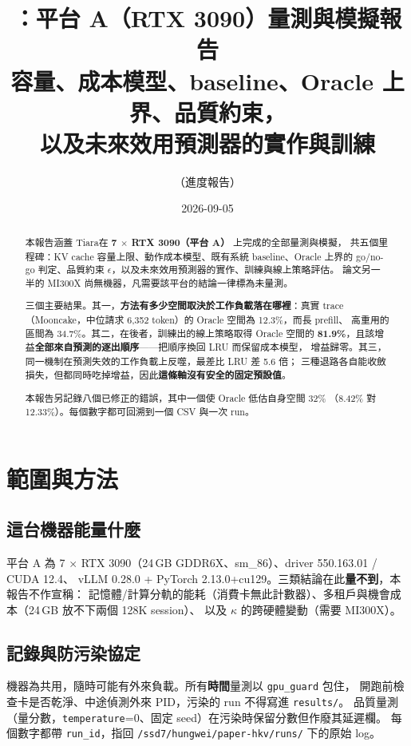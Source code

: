 \documentclass[11pt]{article}
\title{\textbf{\sys：平台 A（RTX 3090）量測與模擬報告}\\[0.35em]
\large 容量、成本模型、baseline、Oracle 上界、品質約束，\\
以及未來效用預測器的實作與訓練}
\author{（進度報告）}
\date{2026-09-05}
\newcommand{\sys}{\mbox{Tiara}}
\newcommand{\key}[1]{\textcolor{hlcol}{\textbf{#1}}}
\begin{document}
\maketitle

\begin{abstract}
\noindent
本報告涵蓋 \sys 在 \textbf{7 $\times$ RTX 3090（平台 A）} 上完成的全部量測與模擬，
共五個里程碑：KV cache 容量上限、動作成本模型、既有系統 baseline、Oracle 上界的
go/no-go 判定、品質約束 $\epsilon$，以及未來效用預測器的實作、訓練與線上策略評估。
論文另一半的 MI300X 尚無機器，凡需要該平台的結論一律標為未量測。

三個主要結果。其一，\key{方法有多少空間取決於工作負載落在哪裡}：真實 trace
（Mooncake，中位請求 6{,}352 token）的 Oracle 空間為 12.3\%，而長 prefill、
高重用的區間為 34.7\%。其二，在後者，訓練出的線上策略取得 Oracle 空間的
\key{81.9\%}，且該增益\key{全部來自預測的逐出順序}——把順序換回 LRU 而保留成本模型，
增益歸零。其三，同一機制在預測失效的工作負載上反噬，最差比 LRU 差 5.6 倍；
三種退路各自能收斂損失，但都同時吃掉增益，因此\key{這條軸沒有安全的固定預設值}。

本報告另記錄八個已修正的錯誤，其中一個使 Oracle 低估自身空間 32\%
（8.42\% 對 12.33\%）。每個數字都可回溯到一個 CSV 與一次 run。
\end{abstract}

\tableofcontents
\vspace{1em}

\section{範圍與方法}

\subsection{這台機器能量什麼}
平台 A 為 7 $\times$ RTX 3090（24\,GB GDDR6X、sm\_86）、driver 550.163.01 / CUDA 12.4、
vLLM 0.28.0 + PyTorch 2.13.0+cu129。三類結論在此\textbf{量不到}，本報告不作宣稱：
記憶體/計算分軌的能耗（消費卡無此計數器）、多租戶與機會成本（24\,GB 放不下兩個 128K session）、
以及 $\kappa$ 的跨硬體變動（需要 MI300X）。

\subsection{記錄與防污染協定}
機器為共用，隨時可能有外來負載。所有\textbf{時間}量測以 \texttt{gpu\_guard} 包住，
開跑前檢查卡是否乾淨、中途偵測外來 PID，污染的 run 不得寫進 \texttt{results/}。
品質量測（量分數，\texttt{temperature}=0、固定 seed）在污染時保留分數但作廢其延遲欄。
每個數字都帶 \texttt{run\_id}，指回 \texttt{/ssd7/hungwei/paper-hkv/runs/} 下的原始 log。
\end{document}
